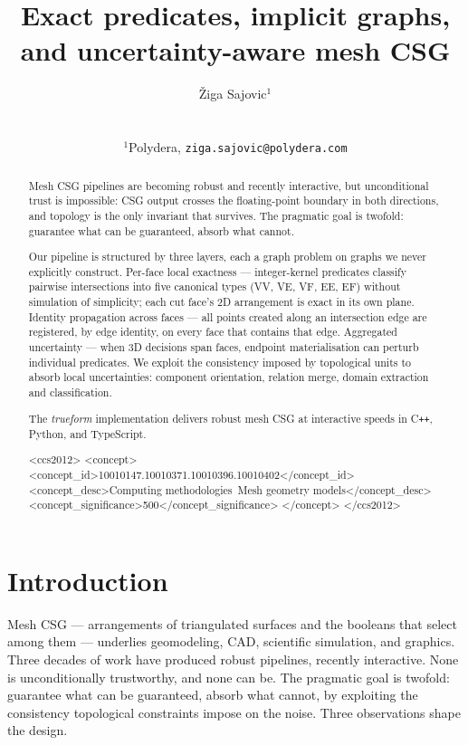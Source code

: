 \documentclass{egpubl}
\title[Uncertainty-aware mesh CSG]%
      {Exact predicates, implicit graphs,\\
       and uncertainty-aware mesh CSG}
\author[\v{Z}. Sajovic]
{\parbox{\textwidth}{\centering \v{Z}iga Sajovic$^{1}$
        }
        \\
{\parbox{\textwidth}{\centering $^1$Polydera, \texttt{ziga.sajovic@polydera.com}
       }
}
}
\begin{document}
\maketitle

\begin{abstract}
Mesh CSG pipelines are becoming robust and recently interactive, but unconditional trust is impossible: CSG output crosses the floating-point boundary in both directions, and topology is the only invariant that survives. The pragmatic goal is twofold: guarantee what can be guaranteed, absorb what cannot.

Our pipeline is structured by three layers, each a graph problem on graphs we never explicitly construct. Per-face local exactness --- integer-kernel predicates classify pairwise intersections into five canonical types (VV, VE, VF, EE, EF) without simulation of simplicity; each cut face's 2D arrangement is exact in its own plane. Identity propagation across faces --- all points created along an intersection edge are registered, by edge identity, on every face that contains that edge. Aggregated uncertainty --- when 3D decisions span faces, endpoint materialisation can perturb individual predicates. We exploit the consistency imposed by topological units to absorb local uncertainties: component orientation, relation merge, domain extraction and classification.

The \emph{trueform} implementation delivers robust mesh CSG at interactive speeds in C\texttt{++}, Python, and TypeScript.
\begin{CCSXML}
<ccs2012>
<concept>
<concept_id>10010147.10010371.10010396.10010402</concept_id>
<concept_desc>Computing methodologies~Mesh geometry models</concept_desc>
<concept_significance>500</concept_significance>
</concept>
</ccs2012>
\end{CCSXML}
\printccsdesc
\end{abstract}

\section{Introduction}
\label{sec:intro}

Mesh CSG --- arrangements of triangulated surfaces and the booleans that select among them --- underlies geomodeling, CAD, scientific simulation, and graphics. Three decades of work have produced robust pipelines, recently interactive. None is unconditionally trustworthy, and none can be. The pragmatic goal is twofold: guarantee what can be guaranteed, absorb what cannot, by exploiting the consistency topological constraints impose on the noise. Three observations shape the design.
\end{document}
